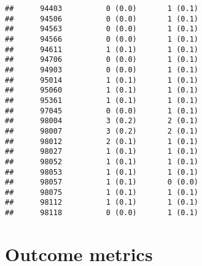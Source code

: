 \documentclass[]{article}
\begin{document}
\begin{verbatim}
##      94403          0 (0.0)       1 (0.1)                       
##      94506          0 (0.0)       1 (0.1)                       
##      94563          0 (0.0)       1 (0.1)                       
##      94566          0 (0.0)       1 (0.1)                       
##      94611          1 (0.1)       1 (0.1)                       
##      94706          0 (0.0)       1 (0.1)                       
##      94903          0 (0.0)       1 (0.1)                       
##      95014          1 (0.1)       1 (0.1)                       
##      95060          1 (0.1)       1 (0.1)                       
##      95361          1 (0.1)       1 (0.1)                       
##      97045          0 (0.0)       1 (0.1)                       
##      98004          3 (0.2)       2 (0.1)                       
##      98007          3 (0.2)       2 (0.1)                       
##      98012          2 (0.1)       1 (0.1)                       
##      98027          1 (0.1)       1 (0.1)                       
##      98052          1 (0.1)       1 (0.1)                       
##      98053          1 (0.1)       1 (0.1)                       
##      98057          1 (0.1)       0 (0.0)                       
##      98075          1 (0.1)       1 (0.1)                       
##      98112          1 (0.1)       1 (0.1)                       
##      98118          0 (0.0)       1 (0.1)
\end{verbatim}

\section{Outcome metrics}\label{outcome-metrics}
\end{document}
